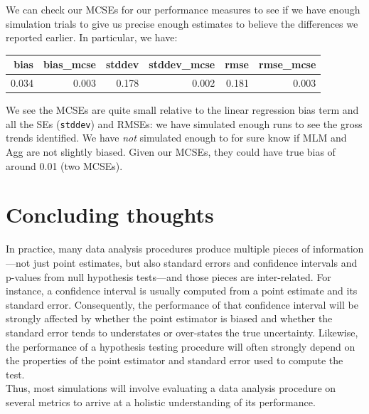 \documentclass[
]{book}
\newenvironment{Shaded}{\begin{snugshade}}{\end{snugshade}}
\newcommand{\AttributeTok}[1]{\textcolor[rgb]{0.13,0.29,0.53}{#1}}
\newcommand{\DecValTok}[1]{\textcolor[rgb]{0.00,0.00,0.81}{#1}}
\newcommand{\FunctionTok}[1]{\textcolor[rgb]{0.13,0.29,0.53}{\textbf{#1}}}
\newcommand{\NormalTok}[1]{#1}
\newcommand{\OtherTok}[1]{\textcolor[rgb]{0.56,0.35,0.01}{#1}}
\newcommand{\SpecialCharTok}[1]{\textcolor[rgb]{0.81,0.36,0.00}{\textbf{#1}}}
\newcommand{\StringTok}[1]{\textcolor[rgb]{0.31,0.60,0.02}{#1}}
\begin{document}
We can check our MCSEs for our performance measures to see if we have enough simulation trials to give us precise enough estimates to believe the differences we reported earlier.
In particular, we have:

\begin{Shaded}
\end{Shaded}

\begin{tabular}{r|r|r|r|r|r}
\hline
bias & bias\_mcse & stddev & stddev\_mcse & rmse & rmse\_mcse\\
\hline
0.034 & 0.003 & 0.178 & 0.002 & 0.181 & 0.003\\
\hline
\end{tabular}

We see the MCSEs are quite small relative to the linear regression bias term and all the SEs (\texttt{stddev}) and RMSEs: we have simulated enough runs to see the gross trends identified.
We have \emph{not} simulated enough to for sure know if MLM and Agg are not slightly biased. Given our MCSEs, they could have true bias of around 0.01 (two MCSEs).

\section{Concluding thoughts}\label{concluding-thoughts}

In practice, many data analysis procedures produce multiple pieces of information---not just point estimates, but also standard errors and confidence intervals and p-values from null hypothesis tests---and those pieces are inter-related.
For instance, a confidence interval is usually computed from a point estimate and its standard error.
Consequently, the performance of that confidence interval will be strongly affected by whether the point estimator is biased and whether the standard error tends to understates or over-states the true uncertainty.
Likewise, the performance of a hypothesis testing procedure will often strongly depend on the properties of the point estimator and standard error used to compute the test.\\
Thus, most simulations will involve evaluating a data analysis procedure on several metrics to arrive at a holistic understanding of its performance.
\end{document}
